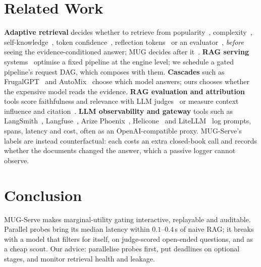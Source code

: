 \documentclass[11pt]{article}
\begin{document}
\section{Related Work}
\textbf{Adaptive retrieval} decides whether to retrieve from
popularity~\citep{whennottotrust}, complexity~\citep{adaptiverag},
self-knowledge~\citep{skr}, token confidence~\citep{flare}, reflection
tokens~\citep{selfrag} or an evaluator~\citep{crag,selfroute}, \emph{before}
seeing the evidence-conditioned answer; MUG decides after it~\citep{mug}.
\textbf{RAG serving} systems~\citep{piperag,ragcache,vllm} optimise a fixed
pipeline at the engine level; we schedule a gated pipeline's request DAG, which
composes with them. \textbf{Cascades} such as FrugalGPT~\citep{frugalgpt} and
AutoMix~\citep{automix} choose which model answers; ours chooses whether the
expensive model reads the evidence. \textbf{RAG evaluation and
attribution} tools score faithfulness and relevance with LLM
judges~\citep{ragas,ares,trulens} or measure context influence and
citation~\citep{contextcite,cad,alce}. \textbf{LLM observability and gateway}
tools such as LangSmith~\citep{langsmith}, Langfuse~\citep{langfuse}, Arize
Phoenix~\citep{phoenix}, Helicone~\citep{helicone} and LiteLLM~\citep{litellm}
log prompts, spans, latency and cost, often as an OpenAI-compatible proxy.
MUG-Serve's labels are instead counterfactual: each costs an extra closed-book
call and records whether the documents changed the answer, which a passive
logger cannot observe.

\section{Conclusion}
MUG-Serve makes marginal-utility gating interactive, replayable and auditable.
Parallel probes bring its median latency within $0.1$--$0.4$\,s of naive
RAG; it breaks with a model that filters for
itself, on judge-scored open-ended questions, and as a cheap scout. Our advice: parallelise probes first, put
deadlines on optional stages, and monitor retrieval health and leakage.
\end{document}

